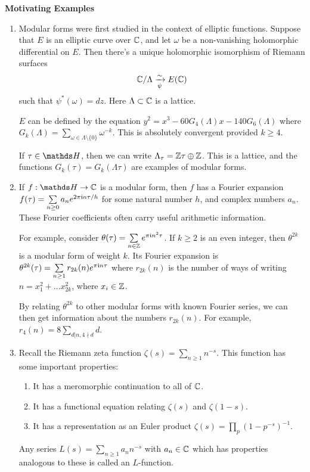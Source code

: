 \documentclass[10pt,a4paper]{article}
\begin{document}
\textbf{Motivating Examples}
\begin{enumerate}
  \item Modular forms were first studied in the context of elliptic functions. Suppose that $E$ is an elliptic curve over $\mathbb{C}$, and let $\omega$ be a non-vanishing holomorphic differential on $E$. Then there's a unique holomorphic isomorphism of Riemann surfaces
  \[\mathbb{C}/\Lambda \xrightarrow[\psi]{\sim} E(\mathbb{C})\]
  such that $\psi^{\ast}(\omega) = dz$. Here $\Lambda\subset\mathbb{C}$ is a lattice.

  $E$ can be defined by the equation $y^2=x^3-60G_4(\Lambda)x-140G_6(\Lambda)$ where $G_k(\Lambda) = \sum\limits_{\omega \in \Lambda\setminus\{0\}}\omega^{-k}$. This is absolutely convergent provided $k \geq 4$.

  If $\tau \in \H$, then we can write $\Lambda_\tau = \mathbb{Z}\tau \oplus \mathbb{Z}$. This is a lattice, and the functions $G_k(\tau) = G_k(\Lambda \tau)$ are examples of modular forms.

  \item If $f:\H \to \C$ is a modular form, then $f$ has a Fourier expansion $f(\tau) = \sum\limits_{n\geq 0}a_n e^{2\pi\mathfrak{i} n\tau/h}$ for some natural number $h$, and complex numbers $a_n$. These Fourier coefficients often carry useful arithmetic information.

  For example, consider $\theta(\tau) = \sum\limits_{n \in \mathbb{Z}}e^{\pi\mathfrak{i} n^2\tau}$. If $k \geq 2$ is an even integer, then $\theta^{2k}$ is a modular form of weight $k$. Its Fourier expansion is $\theta^{2k}(\tau) = \sum\limits_{n \geq1}r_{2k}(n)e^{\pi\mathfrak{i} n \tau}$ where $r_{2k}(n)$ is the number of ways of writing $n = x_1^2 + \ldots x_{2k}^2$, where $x_i \in \mathbb{Z}$.

  By relating $\theta^{2k}$ to other modular forms with known Fourier series, we can then get information about the numbers $r_{2k}(n)$. For example, $r_4(n) = 8\sum\limits_{d|n, 4\nmid d} d$.

  \item Recall the Riemann zeta function $\zeta(s) = \sum_{n\geq 1}n^{-s}$. This function has some important properties:
  \begin{enumerate}[label=\alph*)]
    \item It has a meromorphic continuation to all of $\mathbb{C}$.
    \item It has a functional equation relating $\zeta(s)$ and $\zeta(1-s)$.
    \item It has a representation as an Euler product $\zeta(s) = \prod_{p}(1-p^{-s})^{-1}$.
  \end{enumerate}
  Any series $L(s) = \sum_{n\geq 1}a_n n^{-s}$ with $a_n \in \mathbb{C}$ which has properties analogous to these is called an $L$-function.


\end{enumerate}
\end{document}
